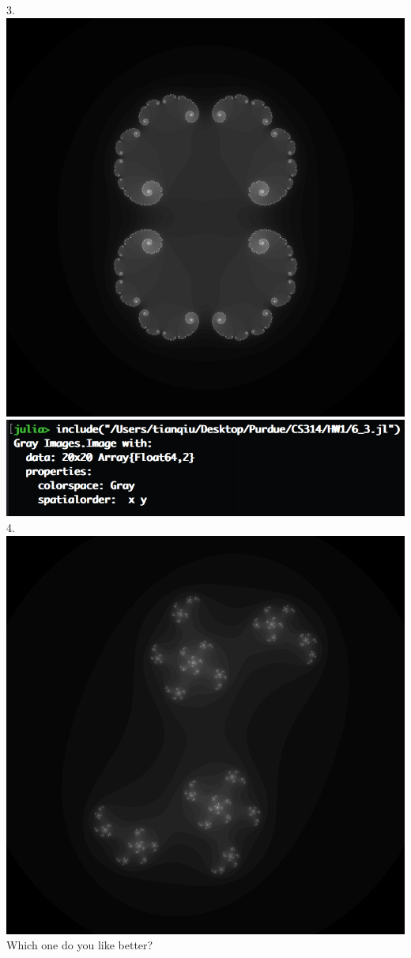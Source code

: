 \documentclass[]{article}
\begin{document}
3. \includegraphics[scale=0.5]{6_4}\\
\includegraphics[scale=0.8]{6_2}\\
4. \includegraphics[scale=0.5]{6_5}
  Which one do you like better?\\
  
\end{document}
